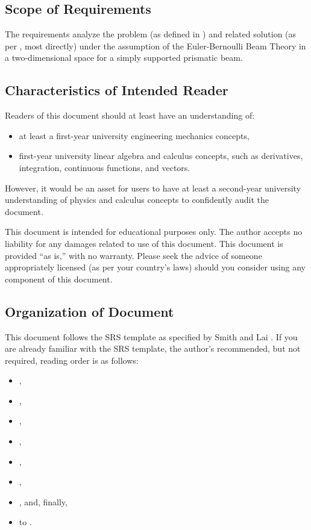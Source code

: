 \documentclass[12pt]{article}
\begin{document}
\subsection{Scope of Requirements}
\label{ssec_scope}

The requirements analyze the problem (as defined in ) and related
solution (as per , most directly) under the assumption of the
Euler-Bernoulli Beam Theory \cite{EulerBernoulliWiki} in a two-dimensional space
for a simply supported prismatic beam.

\subsection{Characteristics of Intended Reader}
\label{sec_IntendedReader}

Readers of this document should at least have an understanding of:
\begin{itemize}

    \item at least a first-year university engineering mechanics concepts,

    \item first-year university linear algebra and calculus concepts, such as
          derivatives, integration, continuous functions, and vectors.

\end{itemize}

However, it would be an asset for users to have at least a second-year
university understanding of physics and calculus concepts to confidently audit
the document.

This document is intended for educational purposes only. The author accepts no
liability for any damages related to use of this document. This document is
provided ``as is,'' with no warranty. Please seek the advice of someone
appropriately licensed (as per your country's laws) should you consider using
any component of this document.

\subsection{Organization of Document}

This document follows the SRS template as specified by Smith and Lai
\cite{SmithAndLai2005}. If you are already familiar with the SRS template, the
author's recommended, but not required, reading order is as follows:

\begin{itemize}
    \item {},
    \item {},
    \item {},
    \item {},
    \item {},
    \item {},
    \item {}, and, finally,
    \item {} to .
\end{itemize}
\end{document}
